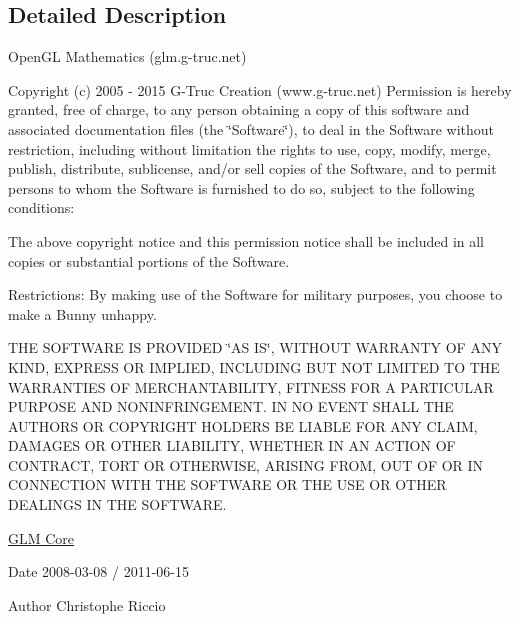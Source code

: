 \subsection{Detailed Description}
Open\-G\-L Mathematics (glm.\-g-\/truc.\-net)

Copyright (c) 2005 -\/ 2015 G-\/\-Truc Creation (www.\-g-\/truc.\-net) Permission is hereby granted, free of charge, to any person obtaining a copy of this software and associated documentation files (the \char`\"{}\-Software\char`\"{}), to deal in the Software without restriction, including without limitation the rights to use, copy, modify, merge, publish, distribute, sublicense, and/or sell copies of the Software, and to permit persons to whom the Software is furnished to do so, subject to the following conditions\-:

The above copyright notice and this permission notice shall be included in all copies or substantial portions of the Software.

Restrictions\-: By making use of the Software for military purposes, you choose to make a Bunny unhappy.

T\-H\-E S\-O\-F\-T\-W\-A\-R\-E I\-S P\-R\-O\-V\-I\-D\-E\-D \char`\"{}\-A\-S I\-S\char`\"{}, W\-I\-T\-H\-O\-U\-T W\-A\-R\-R\-A\-N\-T\-Y O\-F A\-N\-Y K\-I\-N\-D, E\-X\-P\-R\-E\-S\-S O\-R I\-M\-P\-L\-I\-E\-D, I\-N\-C\-L\-U\-D\-I\-N\-G B\-U\-T N\-O\-T L\-I\-M\-I\-T\-E\-D T\-O T\-H\-E W\-A\-R\-R\-A\-N\-T\-I\-E\-S O\-F M\-E\-R\-C\-H\-A\-N\-T\-A\-B\-I\-L\-I\-T\-Y, F\-I\-T\-N\-E\-S\-S F\-O\-R A P\-A\-R\-T\-I\-C\-U\-L\-A\-R P\-U\-R\-P\-O\-S\-E A\-N\-D N\-O\-N\-I\-N\-F\-R\-I\-N\-G\-E\-M\-E\-N\-T. I\-N N\-O E\-V\-E\-N\-T S\-H\-A\-L\-L T\-H\-E A\-U\-T\-H\-O\-R\-S O\-R C\-O\-P\-Y\-R\-I\-G\-H\-T H\-O\-L\-D\-E\-R\-S B\-E L\-I\-A\-B\-L\-E F\-O\-R A\-N\-Y C\-L\-A\-I\-M, D\-A\-M\-A\-G\-E\-S O\-R O\-T\-H\-E\-R L\-I\-A\-B\-I\-L\-I\-T\-Y, W\-H\-E\-T\-H\-E\-R I\-N A\-N A\-C\-T\-I\-O\-N O\-F C\-O\-N\-T\-R\-A\-C\-T, T\-O\-R\-T O\-R O\-T\-H\-E\-R\-W\-I\-S\-E, A\-R\-I\-S\-I\-N\-G F\-R\-O\-M, O\-U\-T O\-F O\-R I\-N C\-O\-N\-N\-E\-C\-T\-I\-O\-N W\-I\-T\-H T\-H\-E S\-O\-F\-T\-W\-A\-R\-E O\-R T\-H\-E U\-S\-E O\-R O\-T\-H\-E\-R D\-E\-A\-L\-I\-N\-G\-S I\-N T\-H\-E S\-O\-F\-T\-W\-A\-R\-E.

\hyperlink{group__core}{G\-L\-M Core}

\begin{DoxyDate}{Date}
2008-\/03-\/08 / 2011-\/06-\/15 
\end{DoxyDate}
\begin{DoxyAuthor}{Author}
Christophe Riccio 
\end{DoxyAuthor}
